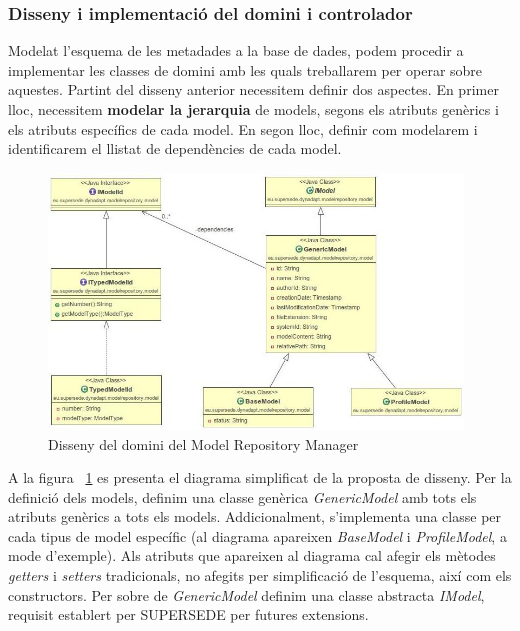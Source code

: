 \subsubsection{Disseny i implementació del domini i controlador}

Modelat l'esquema de les metadades a la base de dades, podem procedir a implementar les classes de domini amb les quals treballarem per operar sobre aquestes. Partint del disseny anterior necessitem definir dos aspectes. En primer lloc, necessitem \textbf{modelar la jerarquia} de models, segons els atributs genèrics i els atributs específics de cada model. En segon lloc, definir com modelarem i identificarem el llistat de dependències de cada model.\\

\begin{figure}
\centering
\includegraphics[width=11cm]{Figures/Figure21}
\decoRule
\caption{Disseny del domini del Model Repository Manager}
\label{fig:Figura21}
\end{figure}

A la figura ~\ref{fig:Figura21} es presenta el diagrama simplificat de la proposta de disseny. Per la definició dels models, definim una classe genèrica \textit{GenericModel} amb tots els atributs genèrics a tots els models. Addicionalment, s'implementa una classe per cada tipus de model específic (al diagrama apareixen \textit{BaseModel} i \textit{ProfileModel}, a mode d'exemple). Als atributs que apareixen al diagrama cal afegir els mètodes \textit{getters} i \textit{setters} tradicionals, no afegits per simplificació de l'esquema, així com els constructors. Per sobre de \textit{GenericModel} definim una classe abstracta \textit{IModel}, requisit establert per SUPERSEDE per futures extensions. \\

